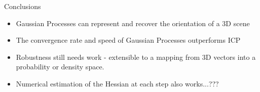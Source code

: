 \documentclass[final]{beamer}
\begin{document}
\begin{frame}{}
\begin{textblock}{27}
\begin{block}{Conclusions}
\begin{itemize}
\item Gaussian Processes can represent and recover the orientation of a 3D scene
\item The convergence rate and speed of Gaussian Processes outperforms ICP
\item Robustness still needs work - extensible to a mapping from 3D vectors into a probability or density space.
\item Numerical estimation of the Hessian at each step also works...???
\end{itemize}
\end{block}


\end{textblock}

\end{frame}
\end{document}
